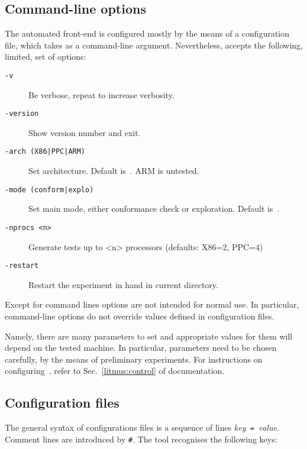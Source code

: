 \subsection{Command-line options}
The automated front-end \dont{} is configured mostly by the means
of a configuration file, which \dont{} takes as a command-line argument.
Nevertheless, \dont{} accepts the following, limited, set of options:
\begin{description}
\item[{\tt -v}] Be verbose, repeat to increase verbosity.
\item[{\tt -version}]  Show version number and exit.
\item[{\tt -arch (X86|PPC|ARM)}] Set architecture. Default is~.
ARM is untested.
\item[{\tt -mode (conform|explo)}] Set main mode,
either conformance check or exploration. Default is~.
\item[{\tt -nprocs <n>}]
Generate tests up to <n> processors (defaults: X86=2, PPC=4)
\item[{\tt -restart}] Restart the experiment in hand in current directory.
\end{description}
Except for  command lines options are not intended
for normal use.
In particular, command-line options do not override values defined
in configuration files.

Namely, there are many parameters to set and appropriate values
for them will depend on the tested machine.
In particular, \litmus{} parameters need to be chosen carefully, by
the means of preliminary experiments.
For instructions on configuring~\litmus{}, refer to
Sec.~\ref{litmus:control} of \litmus{} documentation.


\subsection{Configuration files}
The general syntax of configurations files is a sequence of
lines \textit{key}\texttt{ = }\textit{value}.
Comment lines are introduced by \verb+#+.
The tool \dont{} recognises the following keys:

